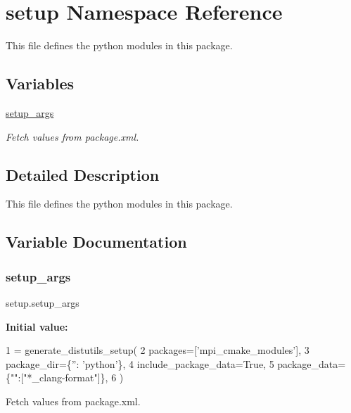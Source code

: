 \hypertarget{namespacesetup}{}\section{setup Namespace Reference}
\label{namespacesetup}


This file defines the python modules in this package.  


\subsection*{Variables}
\begin{DoxyCompactItemize}
\item 
\hyperlink{namespacesetup_a504ffa482edfe0eff08f64b2f5dff0e9}{setup\+\_\+args}
\begin{DoxyCompactList}\small\item\em Fetch values from package.\+xml. \end{DoxyCompactList}\end{DoxyCompactItemize}


\subsection{Detailed Description}
This file defines the python modules in this package. 

\subsection{Variable Documentation}
\mbox{\label{namespacesetup_a504ffa482edfe0eff08f64b2f5dff0e9}} 
\subsubsection{\texorpdfstring{setup\+\_\+args}{setup\_args}}
{\footnotesize\ttfamily setup.\+setup\+\_\+args}

{\bfseries Initial value\+:}
\begin{DoxyCode}
1 =  generate\_distutils\_setup(
2     packages=[\textcolor{stringliteral}{'mpi\_cmake\_modules'}],
3     package\_dir=\{\textcolor{stringliteral}{''}: \textcolor{stringliteral}{'python'}\},
4     include\_package\_data=\textcolor{keyword}{True},
5     package\_data=\{\textcolor{stringliteral}{""}:[\textcolor{stringliteral}{"*\_clang-format"}]\},
6 )
\end{DoxyCode}


Fetch values from package.\+xml. 

